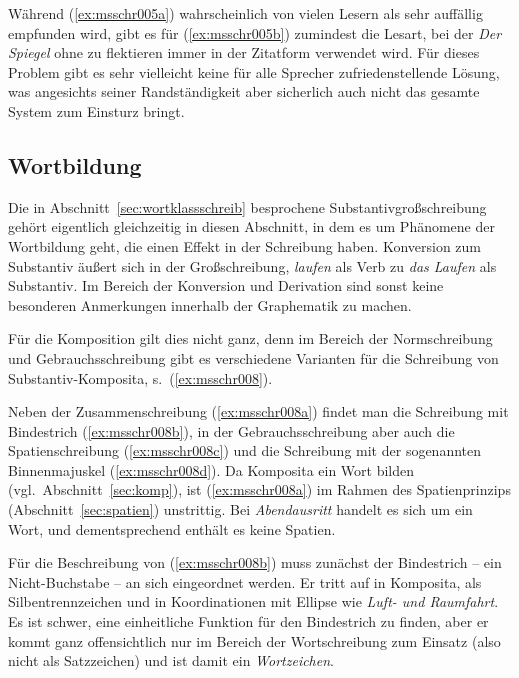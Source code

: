 Während (\ref{ex:msschr005a}) wahrscheinlich von vielen Lesern als sehr auffällig empfunden wird, gibt es für (\ref{ex:msschr005b}) zumindest die Lesart, bei der \textit{Der Spiegel} ohne zu flektieren immer in der Zitatform verwendet wird.
Für dieses Problem gibt es sehr vielleicht keine für alle Sprecher zufriedenstellende Lösung, was angesichts seiner Randständigkeit aber sicherlich auch nicht das gesamte System zum Einsturz bringt.

\subsection{Wortbildung}

\label{sec:wortbildschreib}

Die in Abschnitt~\ref{sec:wortklassschreib} besprochene Substantivgroßschreibung gehört eigentlich gleichzeitig in diesen Abschnitt, in dem es um Phänomene der Wortbildung geht, die einen Effekt in der Schreibung haben.
Konversion zum Substantiv äußert sich in der Großschreibung, \zB \textit{laufen} als Verb zu \textit{das Laufen} als Substantiv.
Im Bereich der Konversion und Derivation sind sonst keine besonderen Anmerkungen innerhalb der Graphematik zu machen.

Für die Komposition gilt dies nicht ganz, denn im Bereich der Normschreibung und Gebrauchsschreibung gibt es verschiedene Varianten für die Schreibung von Substantiv-Komposita, s.\ (\ref{ex:msschr008}).
\begin{exe}
  \ex\label{ex:msschr008} 
  \begin{xlist}
  \end{xlist}
\end{exe}

Neben der Zusammenschreibung (\ref{ex:msschr008a}) findet man die Schreibung mit Bindestrich (\ref{ex:msschr008b}), in der Gebrauchsschreibung aber auch die Spatienschreibung (\ref{ex:msschr008c}) und die Schreibung mit der sogenannten Binnenmajuskel (\ref{ex:msschr008d}).
Da Komposita ein Wort bilden (vgl.\ Abschnitt~\ref{sec:komp}), ist (\ref{ex:msschr008a}) im Rahmen des Spatienprinzips (Abschnitt~\ref{sec:spatien}) unstrittig.
Bei \textit{Abendausritt} handelt es sich um ein Wort, und dementsprechend enthält es keine Spatien.

Für die Beschreibung von (\ref{ex:msschr008b}) muss zunächst der Bindestrich -- ein Nicht-Buchstabe -- an sich eingeordnet werden.
Er tritt auf in Komposita, als Silbentrennzeichen und in Koordinationen mit Ellipse wie \textit{Luft- und Raumfahrt}.
Es ist schwer, eine einheitliche Funktion für den Bindestrich zu finden, aber er kommt ganz offensichtlich nur im Bereich der Wortschreibung zum Einsatz (also nicht als Satzzeichen) und ist damit ein \textit{Wortzeichen}.

